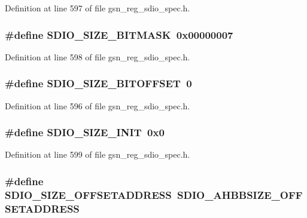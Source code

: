 Definition at line 597 of file gsn\_\-reg\_\-sdio\_\-spec.h.

\hypertarget{a00571_ab1217991230cc24a093d11e2553ee822}{
\subsubsection[{SDIO\_\-SIZE\_\-BITMASK}]{\setlength{\rightskip}{0pt plus 5cm}\#define SDIO\_\-SIZE\_\-BITMASK~0x00000007}}
\label{a00571_ab1217991230cc24a093d11e2553ee822}


Definition at line 598 of file gsn\_\-reg\_\-sdio\_\-spec.h.

\hypertarget{a00571_a3e278d6edb212ceef56a335b477c49ef}{
\subsubsection[{SDIO\_\-SIZE\_\-BITOFFSET}]{\setlength{\rightskip}{0pt plus 5cm}\#define SDIO\_\-SIZE\_\-BITOFFSET~0}}
\label{a00571_a3e278d6edb212ceef56a335b477c49ef}


Definition at line 596 of file gsn\_\-reg\_\-sdio\_\-spec.h.

\hypertarget{a00571_a84341c745860eadb028bf754e1f1045e}{
\subsubsection[{SDIO\_\-SIZE\_\-INIT}]{\setlength{\rightskip}{0pt plus 5cm}\#define SDIO\_\-SIZE\_\-INIT~0x0}}
\label{a00571_a84341c745860eadb028bf754e1f1045e}


Definition at line 599 of file gsn\_\-reg\_\-sdio\_\-spec.h.

\hypertarget{a00571_a0c36937def3799b603bffe71c41f1f76}{
\subsubsection[{SDIO\_\-SIZE\_\-OFFSETADDRESS}]{\setlength{\rightskip}{0pt plus 5cm}\#define SDIO\_\-SIZE\_\-OFFSETADDRESS~SDIO\_\-AHBBSIZE\_\-OFFSETADDRESS}}
\label{a00571_a0c36937def3799b603bffe71c41f1f76}


